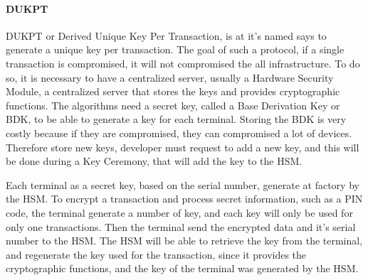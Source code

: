 \documentclass[10pt,a4paper]{article}
\begin{document}
\paragraph{DUKPT}

DUKPT or Derived Unique Key Per Transaction, is at it's named
says to generate a unique key per transaction.
The goal of such a protocol, if a single transaction is compromised,
it will not compromised the all infrastructure.
To do so, it is necessary to have a centralized server, usually
a Hardware Security Module, a centralized server that stores
the keys and provides cryptographic functions.
The algorithms need a secret key,
called a Base Derivation Key or BDK, to be able to generate
a key for each terminal. Storing the BDK is very costly because
if they are compromised, they can compromised a lot of devices.
Therefore store new keys, developer must request to add a new
key, and this will be done during a Key Ceremony, that will
add the key to the HSM.

Each terminal as a secret key, based on the serial number,
generate at factory by the HSM. To encrypt a transaction and process
secret information, such as a PIN code, the terminal generate a number
of key, and each key will only be used for only one transactions.
Then the terminal send the encrypted data and it's serial number to the HSM.
The HSM will be able to retrieve the key from the terminal, and
regenerate the key used for the transaction, since it provides
the cryptographic functions, and the
key of the terminal was generated by the HSM.



\label{sec:hsm}




\end{document}
